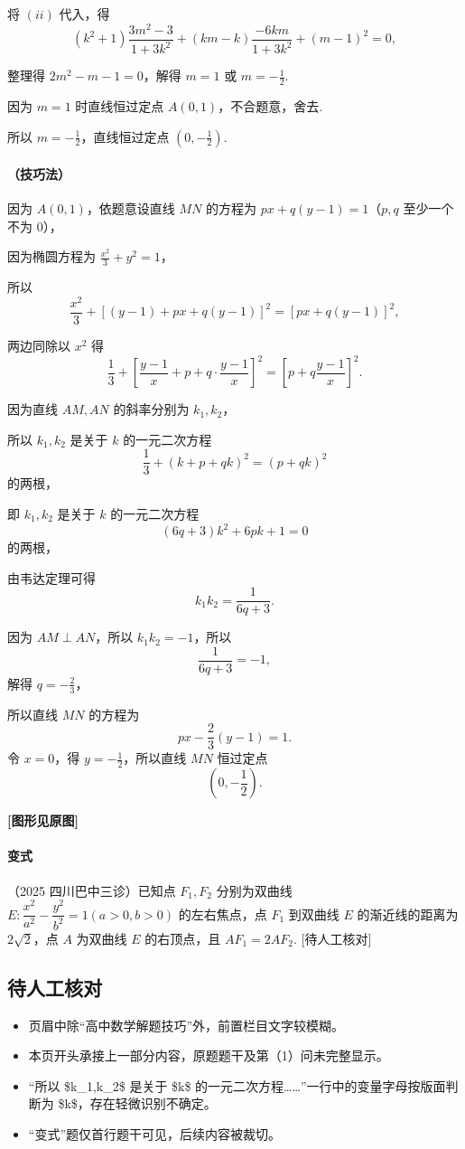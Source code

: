 \documentclass[UTF8,a4paper,11pt]{ctexart}
\begin{document}
将 $(ii)$ 代入，得
\[
(k^2+1)\frac{3m^2-3}{1+3k^2}+(km-k)\frac{-6km}{1+3k^2}+(m-1)^2=0,
\]

整理得 $2m^2-m-1=0$，解得 $m=1$ 或 $m=-\frac{1}{2}$.

因为 $m=1$ 时直线恒过定点 $A(0,1)$，不合题意，舍去.

所以 $m=-\frac{1}{2}$，直线恒过定点 $\left(0,-\frac{1}{2}\right)$.

\paragraph{（技巧法）}因为 $A(0,1)$，依题意设直线 $MN$ 的方程为 $px+q(y-1)=1$（$p,q$ 至少一个不为 0），

因为椭圆方程为 $\frac{x^2}{3}+y^2=1$，

所以
\[
\frac{x^2}{3}+[(y-1)+px+q(y-1)]^2=[px+q(y-1)]^2,
\]

两边同除以 $x^2$ 得
\[
\frac{1}{3}+\left[\frac{y-1}{x}+p+q\cdot\frac{y-1}{x}\right]^2=\left[p+q\frac{y-1}{x}\right]^2.
\]

因为直线 $AM,AN$ 的斜率分别为 $k_1,k_2$，

所以 $k_1,k_2$ 是关于 $k$ 的一元二次方程
\[
\frac{1}{3}+(k+p+qk)^2=(p+qk)^2
\]
的两根，

即 $k_1,k_2$ 是关于 $k$ 的一元二次方程
\[
(6q+3)k^2+6pk+1=0
\]
的两根，

由韦达定理可得
\[
k_1k_2=\frac{1}{6q+3}.
\]

因为 $AM\perp AN$，所以 $k_1k_2=-1$，所以
\[
\frac{1}{6q+3}=-1,
\]
解得 $q=-\frac{2}{3}$，

所以直线 $MN$ 的方程为
\[
px-\frac{2}{3}(y-1)=1.
\]
令 $x=0$，得 $y=-\frac{1}{2}$，所以直线 $MN$ 恒过定点
\[
\left(0,-\frac{1}{2}\right).
\]

\textbf{[图形见原图]}

\paragraph{变式}（2025 四川巴中三诊）已知点 $F_1,F_2$ 分别为双曲线 $E:\dfrac{x^2}{a^2}-\dfrac{y^2}{b^2}=1(a>0,b>0)$ 的左右焦点，点 $F_1$ 到双曲线 $E$ 的渐近线的距离为 $2\sqrt{2}$，点 $A$ 为双曲线 $E$ 的右顶点，且 $AF_1=2AF_2$.
[待人工核对]

\subsection*{待人工核对}

\begin{itemize}

\item 页眉中除“高中数学解题技巧”外，前置栏目文字较模糊。

\item 本页开头承接上一部分内容，原题题干及第（1）问未完整显示。

\item “所以 \$k\_1,k\_2\$ 是关于 \$k\$ 的一元二次方程……”一行中的变量字母按版面判断为 \$k\$，存在轻微识别不确定。

\item “变式”题仅首行题干可见，后续内容被裁切。

\end{itemize}
\end{document}
